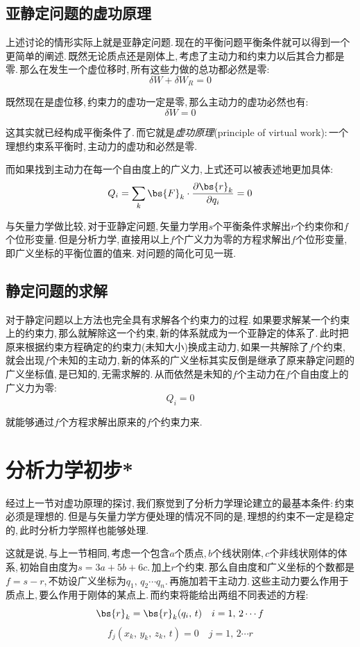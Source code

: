 \subsection{亚静定问题的虚功原理}

上述讨论的情形实际上就是亚静定问题.\,现在的平衡问题平衡条件就可以得到一个更简单的阐述.\,既然无论质点还是刚体上,\,考虑了主动力和约束力以后其合力都是零.\,那么在发生一个虚位移时,\,所有这些力做的总功都必然是零:
\[\delta W+\delta W_R=0 \]

既然现在是虚位移,\,约束力的虚功一定是零,\,那么主动力的虚功必然也有:
\[\delta W=0\]

这其实就已经构成平衡条件了.\,而它就是\emph{虚功原理}(principle of virtual work):\,一个理想约束系平衡时,\,主动力的虚功和必然是零.

而如果找到主动力在每一个自由度上的广义力,\,上式还可以被表述地更加具体:
\[Q_i=\sum_k \bs{F}_k\cdot \frac{\partial \bs{r}_k}{\partial q_i}=0\]

与矢量力学做比较,\,对于亚静定问题,\,矢量力学用$s$个平衡条件求解出$r$个约束你和$f$个位形变量.\,但是分析力学,\,直接用以上$f$个广义力为零的方程求解出$f$个位形变量,\,即广义坐标的平衡位置的值来.\,对问题的简化可见一斑.

\subsection{静定问题的求解}

对于静定问题以上方法也完全具有求解各个约束力的过程.\,如果要求解某一个约束上的约束力,\,那么就解除这一个约束,\,新的体系就成为一个亚静定的体系了.\,此时把原来根据约束方程确定的约束力(未知大小)换成主动力,\,如果一共解除了$f$个约束,\,就会出现$f$个未知的主动力,\,新的体系的广义坐标其实反倒是继承了原来静定问题的广义坐标值,\,是已知的,\,无需求解的.\,从而依然是未知的$f$个主动力在$f$个自由度上的广义力为零:
\[Q_i=0\]

就能够通过$f$个方程求解出原来的$f$个约束力来.

\section{分析力学初步*}

经过上一节对虚功原理的探讨,\,我们察觉到了分析力学理论建立的最基本条件:\,约束必须是理想的.\,但是与矢量力学方便处理的情况不同的是,\,理想的约束不一定是稳定的,\,此时分析力学照样也能够处理.

这就是说,\,与上一节相同,\,考虑一个包含$a$个质点,\,$b$个线状刚体,\,$c$个非线状刚体的体系,\,初始自由度为$s=3a+5b+6c$.\,加上$r$个约束.\,那么自由度和广义坐标的个数都是$f=s-r$,\,不妨设广义坐标为$q_1,\,q_2\cdots q_n$.\,再施加若干主动力.\,这些主动力要么作用于质点上,\,要么作用于刚体的某点上.\,而约束将能给出两组不同表述的方程:
\[\bs{r}_k=\bs{r}_k(q_i,\,t)\quad i=1,\,2\cdots f\]
\[f_j(x_k,\,y_k,\,z_k,\,t)=0\quad j=1,\,2\cdots r\]

